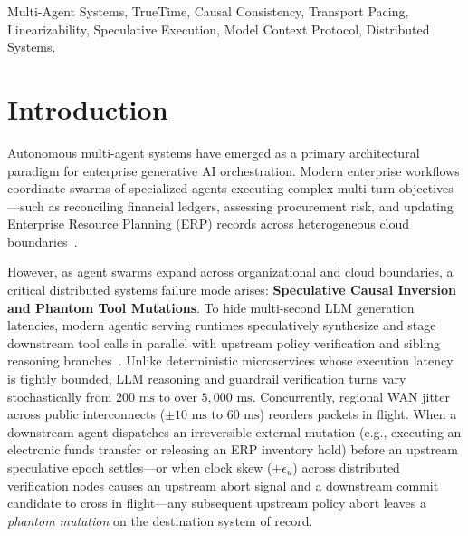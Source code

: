 \documentclass[conference,10pt]{IEEEtran}
\begin{document}
\begin{abstract}
cross-cloud testbed, Agent-Chronos reduced phantom mutations and causal inversions to $0.00\%$, bounding post-settlement TrueTime commit-wait pacing overhead to a mean of $5.91 \pm 2.32\text{ ms}$ ($p_{50} = 5.90\text{ ms}$, $p_{95} = 9.80\text{ ms}$, $p_{99} = 10.84\text{ ms}$) while achieving a net end-to-end speculative speedup of $423.3\text{ ms}$ ($34.6\%$) per committed transaction ($388.5\text{ ms}$, or $31.8\%$, unconditionally across all transactions including aborted branch retries) over non-speculative sequential execution. All protocol transitions are verifiable via deterministic HTTP/2 headers and audit trailers, providing end-to-end cross-organization protocol observability.
\end{abstract}

\begin{IEEEkeywords}
Multi-Agent Systems, TrueTime, Causal Consistency, Transport Pacing, Linearizability, Speculative Execution, Model Context Protocol, Distributed Systems.
\end{IEEEkeywords}

\section{Introduction}
\label{sec:introduction}
Autonomous multi-agent systems have emerged as a primary architectural paradigm for enterprise generative AI orchestration. Modern enterprise workflows coordinate swarms of specialized agents executing complex multi-turn objectives---such as reconciling financial ledgers, assessing procurement risk, and updating Enterprise Resource Planning (ERP) records across heterogeneous cloud boundaries~\cite{mcp2024spec, a2a2025spec, yao2024taubench}.

However, as agent swarms expand across organizational and cloud boundaries, a critical distributed systems failure mode arises: \textbf{Speculative Causal Inversion and Phantom Tool Mutations}. To hide multi-second LLM generation latencies, modern agentic serving runtimes speculatively synthesize and stage downstream tool calls in parallel with upstream policy verification and sibling reasoning branches~\cite{nightingale2005speculator, patil2024goex, chang2025sagallm, ye2025speculative, ro2025sherlock, mohammadi2026atomix}. Unlike deterministic microservices whose execution latency is tightly bounded, LLM reasoning and guardrail verification turns vary stochastically from $200\text{ ms}$ to over $5{,}000\text{ ms}$. Concurrently, regional WAN jitter across public interconnects ($\pm 10\text{ ms}$ to $60\text{ ms}$) reorders packets in flight. When a downstream agent dispatches an irreversible external mutation (e.g., executing an electronic funds transfer or releasing an ERP inventory hold) before an upstream speculative epoch settles---or when clock skew ($\pm \epsilon_u$) across distributed verification nodes causes an upstream abort signal and a downstream commit candidate to cross in flight---any subsequent upstream policy abort leaves a \emph{phantom mutation} on the destination system of record.
\end{document}
